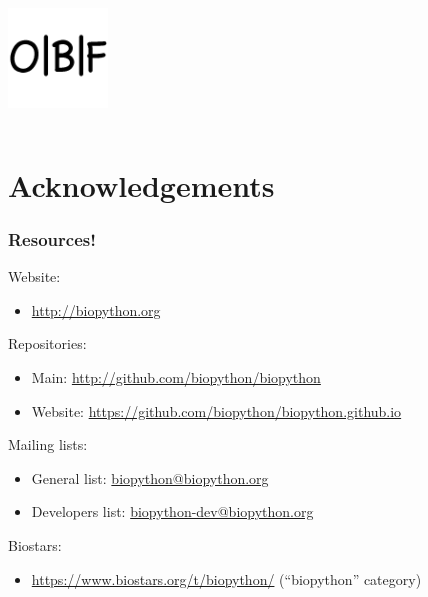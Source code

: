 \documentclass[trans]{beamer}
\begin{document}
{\begin{minipage}{1\textwidth}
\begin{columns}
  \includegraphics[width=0.5\textwidth]{figures/obf-logo.png}
  \end{columns}
  \end{minipage}
}

\section*{Acknowledgements}
\frame
{
  \frametitle{Resources!}

  Website:\\
  \begin{itemize}
  \item \url{http://biopython.org}
  \end{itemize}

  Repositories:\\
  \begin{itemize}
  \item Main: \url{http://github.com/biopython/biopython}
  \item Website: \url{https://github.com/biopython/biopython.github.io}
  \end{itemize}

  Mailing lists:
  \begin{itemize}
  \item General list: \url{biopython@biopython.org}
  \item Developers list: \url{biopython-dev@biopython.org}
  \end{itemize}

  Biostars:
  \begin{itemize}
  \item \url{https://www.biostars.org/t/biopython/} (``biopython'' category)
  \end{itemize}
}
\end{document}
